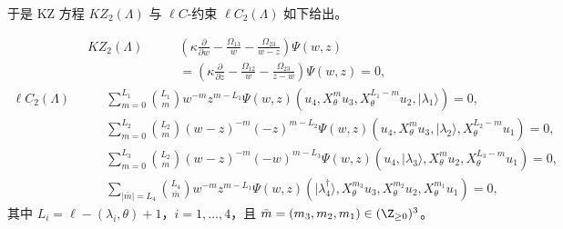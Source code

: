 

于是 KZ 方程 $KZ_2(\Lambda)$ 与 $\ell C$-约束 $\ell C_2(\Lambda)$
如下给出。


\[
\begin{aligned}
KZ_2(\Lambda)\qquad
&\left(\kappa\frac{\partial}{\partial w}-\frac{\Omega_{13}}{w}
-\frac{\Omega_{23}}{w-z}\right)\Psi(w,z)\\
&=\left(\kappa\frac{\partial}{\partial z}-\frac{\Omega_{12}}{w}
-\frac{\Omega_{23}}{z-w}\right)\Psi(w,z)=0,
\end{aligned}
\]
\[
\begin{aligned}
\ell C_2(\Lambda)\qquad
&\sum_{m=0}^{L_1}\binom{L_1}{m}w^{-m}z^{m-L_1}
 \Psi(w,z)(u_4,X_\theta^m u_3,X_\theta^{L_1-m}u_2,|\lambda_1\rangle)=0,\\
&\sum_{m=0}^{L_2}\binom{L_2}{m}(w-z)^{-m}(-z)^{m-L_2}
 \Psi(w,z)(u_4,X_\theta^m u_3,|\lambda_2\rangle,
 X_\theta^{L_2-m}u_1)=0,\\
&\sum_{m=0}^{L_3}\binom{L_2}{m}(w-z)^{-m}(-w)^{m-L_3}
 \Psi(w,z)(u_4,|\lambda_3\rangle,X_\theta^m u_2,
 X_\theta^{L_3-m}u_1)=0,\\
&\sum_{|\bar{m}|=L_4}\binom{L_4}{\bar{m}}w^{-m}z^{m-L_1}
 \Psi(w,z)(|\lambda_4^{\dagger}\rangle,X_\theta^{m_3}u_3,
 X_\theta^{m_2}u_2,X_\theta^{m_1}u_1)=0,
\end{aligned}
\]
其中 $L_i=\ell-(\lambda_i,\theta)+1$，$i=1,\dots,4$，且
$\bar{m}=(m_3,m_2,m_1)\in(\Z_{\ge0})^3$。


